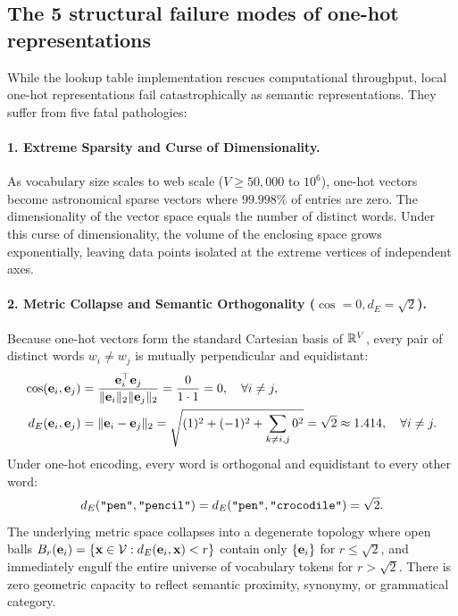 \documentclass[../../main.tex]{subfiles}
\begin{document}
\subsection{The 5 structural failure modes of one-hot representations}
\label{subsec:five_failure_modes}

While the lookup table implementation rescues computational throughput, local one-hot representations fail catastrophically as semantic representations. They suffer from five fatal pathologies:

\paragraph{1. Extreme Sparsity and Curse of Dimensionality.}
As vocabulary size scales to web scale ($V \ge 50{,}000$ to $10^6$), one-hot vectors become astronomical sparse vectors where $99.998\%$ of entries are zero. The dimensionality of the vector space equals the number of distinct words. Under this curse of dimensionality, the volume of the enclosing space grows exponentially, leaving data points isolated at the extreme vertices of independent axes.

\paragraph{2. Metric Collapse and Semantic Orthogonality ($\cos = 0, d_E = \sqrt{2}$).}
Because one-hot vectors form the standard Cartesian basis of $\mathbb{R}^V$, every pair of distinct words $w_i \neq w_j$ is mutually perpendicular and equidistant:
\begin{align}
\label{eq:onehot_cosine}
\cos(\mathbf{e}_i, \mathbf{e}_j) &= \frac{\mathbf{e}_i^\top \mathbf{e}_j}{\|\mathbf{e}_i\|_2 \|\mathbf{e}_j\|_2} = \frac{0}{1 \cdot 1} = 0, \quad \forall i \neq j, \\
\label{eq:onehot_l2}
d_E(\mathbf{e}_i, \mathbf{e}_j) &= \|\mathbf{e}_i - \mathbf{e}_j\|_2 = \sqrt{(1)^2 + (-1)^2 + \sum_{k \neq i, j} 0^2} = \sqrt{2} \approx 1.414, \quad \forall i \neq j.
\end{align}
Under one-hot encoding, every word is orthogonal and equidistant to every other word:
\begin{equation}
\label{eq:equidistance_paradox}
d_E(\text{\texttt{"pen"}}, \text{\texttt{"pencil"}}) = d_E(\text{\texttt{"pen"}}, \text{\texttt{"crocodile"}}) = \sqrt{2}.
\end{equation}
The underlying metric space collapses into a degenerate topology where open balls $B_r(\mathbf{e}_i) = \{\mathbf{x} \in \mathcal{V} : d_E(\mathbf{e}_i, \mathbf{x}) < r\}$ contain only $\{\mathbf{e}_i\}$ for $r \le \sqrt{2}$, and immediately engulf the entire universe of vocabulary tokens for $r > \sqrt{2}$. There is zero geometric capacity to reflect semantic proximity, synonymy, or grammatical category.
\end{document}

